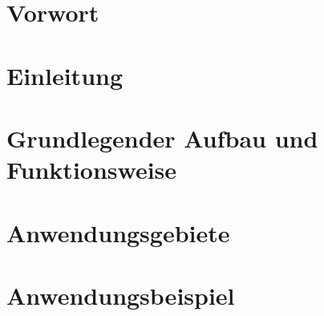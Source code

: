 \documentclass{article}
\begin{document}
    

    \tableofcontents
    \thispagestyle{empty}
    \newpage


    \section{Vorwort}
    
    \newpage

    \section{Einleitung}
    
    \newpage

    \section{Grundlegender Aufbau und Funktionsweise}
    
    \newpage

    \section{Anwendungsgebiete}
    
    \newpage

    \section{Anwendungsbeispiel}
    
    \newpage

    
\end{document}
